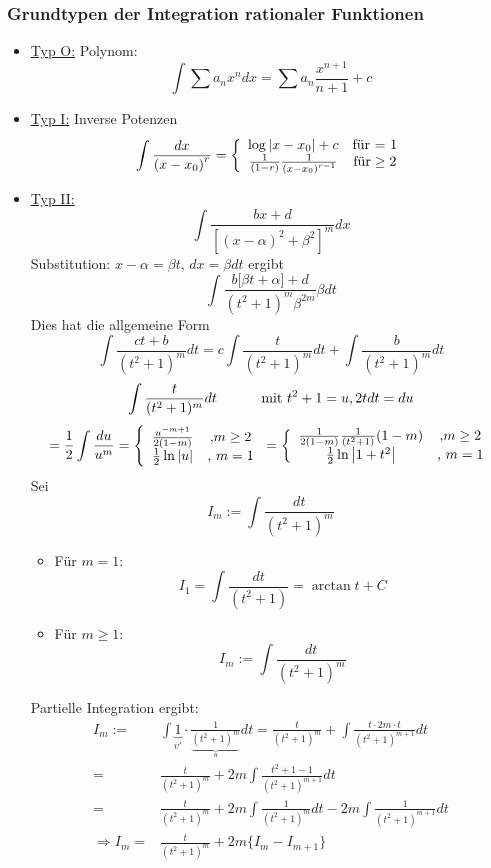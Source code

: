 \subsubsection*{Grundtypen der Integration rationaler Funktionen}
\begin{itemize}
\item \underline{Typ O:} Polynom:\[\int \sum a_{n}x^{n}dx=\sum a_{n}\dfrac {x^{n+1}}{n+1}+c\]
\item \underline{Typ I:} Inverse Potenzen \[\int {\frac{{dx}}{{(x - {x_0})}^r}}  = \left\{ {\begin{array}{*{20}{c}}
{\log \left| {x - {x_0}} \right| + c}&{{\text{für = 1}}}\\
{\frac{1}{{(1 - r)}}\frac{1}{{{{(x - {x_0})}^{r - 1}}}}}&{{\text{für}} \ge {\rm{2}}}
\end{array}} \right.\]

\item \underline{Typ II:}
\[\int { \dfrac {bx+d}{\left[ \left( x-\alpha \right) ^{2}+\beta ^{2}\right] ^{m}}dx}\]
Substitution: $x-\alpha =\beta t$, $dx=\beta dt$ ergibt \[\int {\dfrac {b\lbrack \beta t+\alpha\rbrack +d}{(t^2 +1)^m \beta ^{2m}} \beta dt}\] Dies hat die allgemeine Form \[\int{\frac{ct+b}{(t^2+1)^m}dt}=c\int{\frac{t}{(t^2 +1)^m}dt}+\int{\frac{b}{(t^2 +1)^m} dt}\]
\[\int{\frac{t}{(t^2 +1)^m}dt}\text{\hspace{10mm} mit }t^2+1=u, 2t dt=du\]
$$=\frac{1}{2}\int{\frac{du}{u^m}} = \left\{ {\begin{array}{*{20}{c}}
{\frac{{{u^{ - m + 1}}}}{{2(1 - m)}}}&{{\rm{, }}m \ge 2}\\
{\frac{1}{2}\ln \left| u \right|}&{\text{, }m = 1}
\end{array}} \right. = \left\{ {\begin{array}{*{20}{c}}
{\frac{1}{{2(1 - m)}}\frac{1}{{({t^2} + 1)}}(1 - m)}&{{\rm{, }}m \ge 2}\\
{\frac{1}{2}\ln \left| {1 + {t^2}} \right|}&{\text{, }m = 1}
\end{array}} \right.$$
Sei 
\[I_m :=\int{\frac{dt}{(t^2 +1)^m}}\]
\begin{itemize}
\item Für $m=1$: \[I_1=\int{\frac{dt}{(t^2 +1)}}=\arctan t + C\]
\item Für $m\geq1$:\[ I_m:=\int{\frac{dt}{(t^2 +1)^m}}\]
\end{itemize}

Partielle Integration ergibt:
\begin{align*}
{I_m}:=&\int {\underbrace 1_{v'} \cdot \frac{1}{{\underbrace {{{({t^2} + 1)}^m}}_u}}dt}  = \frac{t}{{{{({t^2} + 1)}^m}}} + \int {\frac{{t \cdot 2m \cdot t}}{{{{({t^2} + 1)}^{m + 1}}}}dt} \\
=&\frac{t}{(t^2 +1)^m} + 2m\int{\frac{t^2 +1-1}{(t^2 +1)^{m+1}}dt}\\
=&\frac{t}{(t^2 +1)^m}+2m\int{\frac{1}{(t^2 +1)^m}dt}-2m\int{\frac{1}{(t^2 +1)^{m+1}}dt}\\
\Rightarrow I_m=&\frac{t}{(t^2 +1)^m}+2m\{ I_m - I_{m+1} \}
\end{align*}




\end{itemize}
